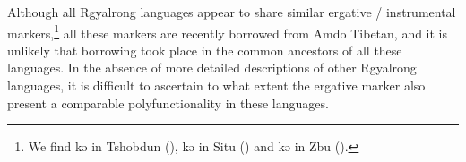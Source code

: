 \documentclass[oldfontcommands,oneside,a4paper,11pt]{article}
\newcommand{\ipa}[1]{{\phon #1}} %
\begin{document}
Although all Rgyalrong languages appear to share similar ergative / instrumental markers,\footnote{We find \ipa{kə} in Tshobdun (\citealt[129-131]{jackson98morphology}),  \ipa{kə} in Situ (\citealt[336]{linxr93jiarong}) and  \ipa{kə} in Zbu  (\citealt{gongxun12}).} all these markers are recently borrowed from Amdo Tibetan, and it is unlikely that borrowing took place in the common ancestors of all these languages. In the absence of more detailed descriptions of other Rgyalrong languages, it is difficult to ascertain to what extent the ergative marker also present a comparable polyfunctionality in these languages.


  


\end{document}
